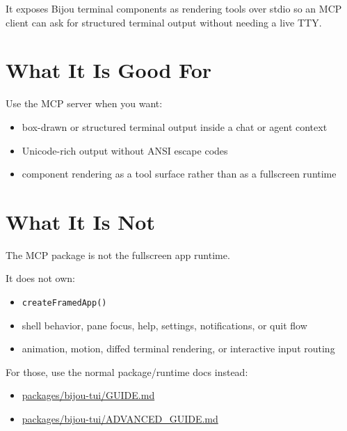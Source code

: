 It exposes Bijou terminal components as rendering tools over stdio so an MCP client can ask for structured terminal output without needing a live TTY.

\section{What It Is Good For}\label{record-009-what-it-is-good-for}

Use the MCP server when you want:

\begin{itemize}
\tightlist
\item
  box-drawn or structured terminal output inside a chat or agent context
\item
  Unicode-rich output without ANSI escape codes
\item
  component rendering as a tool surface rather than as a fullscreen runtime
\end{itemize}

\section{What It Is Not}\label{record-009-what-it-is-not}

The MCP package is not the fullscreen app runtime.

It does not own:

\begin{itemize}
\tightlist
\item
  \texttt{c\allowbreak{}r\allowbreak{}e\allowbreak{}a\allowbreak{}t\allowbreak{}e\allowbreak{}F\allowbreak{}r\allowbreak{}a\allowbreak{}m\allowbreak{}e\allowbreak{}d\allowbreak{}A\allowbreak{}p\allowbreak{}p\allowbreak{}(\allowbreak{})}
\item
  shell behavior, pane focus, help, settings, notifications, or quit flow
\item
  animation, motion, diffed terminal rendering, or interactive input routing
\end{itemize}

For those, use the normal package/runtime docs instead:

\begin{itemize}
\tightlist
\item
  \href{https://github.com/flyingrobots/bijou/blob/cbd70612140e7a450d764b3c7be1c6af878b99bc/packages/bijou-tui/GUIDE.md}{packages/bijou-tui/GUIDE.md}
\item
  \href{https://github.com/flyingrobots/bijou/blob/cbd70612140e7a450d764b3c7be1c6af878b99bc/packages/bijou-tui/ADVANCED_GUIDE.md}{packages/bijou-tui/ADVANCED\_GUIDE.md}
\end{itemize}


